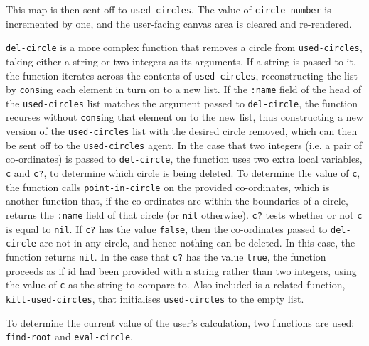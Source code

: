 \documentclass[12pt,twoside,notitlepage,xetex]{report}
\begin{document}
This map is then sent off to \verb¬used-circles¬.  The value of \verb¬circle-number¬ is incremented by one, and the user-facing canvas area is cleared and re-rendered.

\verb¬del-circle¬ is a more complex function that removes a circle from
\verb¬used-circles¬, taking either a string or two integers as its arguments.
If a string is passed to it, the function iterates across the contents of
\verb¬used-circles¬, reconstructing the list by \verb¬cons¬ing each element in
turn on to a new list.  If the \verb¬:name¬ field of the head of the
\verb¬used-circles¬ list matches the argument passed to \verb¬del-circle¬, the
function recurses without \verb¬cons¬ing that element on to the new list, thus
constructing a new version of the \verb¬used-circles¬ list with the desired
circle removed, which can then be sent off to the \verb¬used-circles¬ agent.
In the case that two integers (i.e. a pair of co-ordinates) is passed to
\verb¬del-circle¬, the function uses two extra local variables, \verb¬c¬ and
\verb¬c?¬, to determine which circle is being deleted.  To determine the value
of \verb¬c¬, the function calls \verb¬point-in-circle¬ on the provided
co-ordinates, which is another function that, if the co-ordinates are within
the boundaries of a circle, returns the \verb¬:name¬ field of that circle (or
\verb¬nil¬ otherwise).  \verb¬c?¬ tests whether or not \verb¬c¬ is equal to
\verb¬nil¬.  If \verb¬c?¬ has the value \verb¬false¬, then the co-ordinates
passed to \verb¬del-circle¬ are not in any circle, and hence nothing can be
deleted.  In this case, the function returns \verb¬nil¬.  In the case that
\verb¬c?¬ has the value \verb¬true¬, the function proceeds as if id had been
provided with a string rather than two integers, using the value of \verb¬c¬ as
the string to compare to.  Also included is a related function,
\verb¬kill-used-circles¬, that initialises \verb¬used-circles¬ to the empty
list.

To determine the current value of the user's calculation, two functions are
used: \verb¬find-root¬ and \verb¬eval-circle¬.
\end{document}
